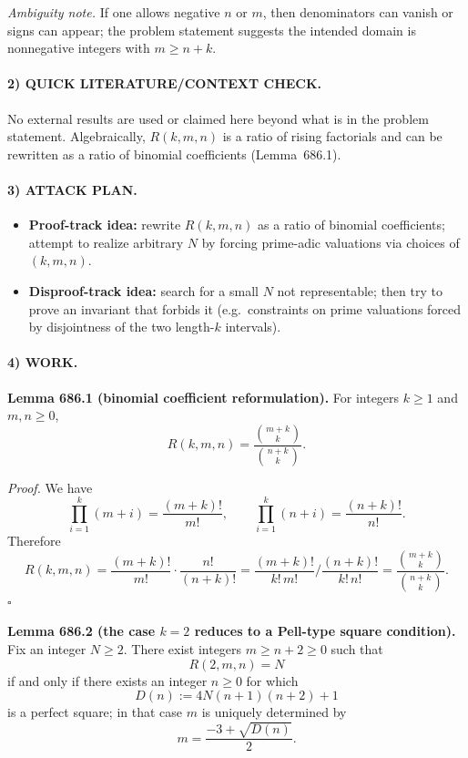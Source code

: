 \emph{Ambiguity note.} If one allows negative $n$ or $m$, then denominators can vanish or signs can appear; the problem statement
suggests the intended domain is nonnegative integers with $m\ge n+k$.

\paragraph{2) QUICK LITERATURE/CONTEXT CHECK.}
No external results are used or claimed here beyond what is in the problem statement.
Algebraically, $R(k,m,n)$ is a ratio of rising factorials and can be rewritten as a ratio of binomial coefficients (Lemma~686.1).

\paragraph{3) ATTACK PLAN.}
\begin{itemize}
\item \textbf{Proof-track idea:} rewrite $R(k,m,n)$ as a ratio of binomial coefficients; attempt to realize arbitrary $N$ by forcing
prime-adic valuations via choices of $(k,m,n)$.
\item \textbf{Disproof-track idea:} search for a small $N$ not representable; then try to prove an invariant that forbids it (e.g.\ constraints on
prime valuations forced by disjointness of the two length-$k$ intervals).
\end{itemize}

\paragraph{4) WORK.}
\medskip
\noindent\textbf{Lemma 686.1 (binomial coefficient reformulation).}
For integers $k\ge 1$ and $m,n\ge 0$,
\[
R(k,m,n)=\frac{\binom{m+k}{k}}{\binom{n+k}{k}}.
\]

\emph{Proof.}
We have
\[
\prod_{i=1}^k (m+i)=\frac{(m+k)!}{m!},\qquad \prod_{i=1}^k (n+i)=\frac{(n+k)!}{n!}.
\]
Therefore
\[
R(k,m,n)=\frac{(m+k)!}{m!}\cdot \frac{n!}{(n+k)!}
=\frac{(m+k)!}{k!\,m!}\bigg/\frac{(n+k)!}{k!\,n!}
=\frac{\binom{m+k}{k}}{\binom{n+k}{k}}.
\]
\hfill$\square$

\medskip
\noindent\textbf{Lemma 686.2 (the case $k=2$ reduces to a Pell-type square condition).}
Fix an integer $N\ge 2$. There exist integers $m\ge n+2\ge 0$ such that
\[
R(2,m,n)=N
\]
if and only if there exists an integer $n\ge 0$ for which
\[
D(n):=4N(n+1)(n+2)+1
\]
is a perfect square; in that case $m$ is uniquely determined by
\[
m=\frac{-3+\sqrt{D(n)}}{2}.
\]

